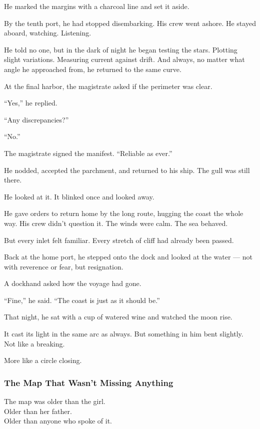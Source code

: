 \documentclass[12pt]{article}
\begin{document}
He marked the margins with a charcoal line and set it aside.

By the tenth port, he had stopped disembarking. His crew went ashore. He stayed aboard, watching. Listening.

He told no one, but in the dark of night he began testing the stars. Plotting slight variations. Measuring current against drift. And always, no matter what angle he approached from, he returned to the same curve.

At the final harbor, the magistrate asked if the perimeter was clear.

``Yes,'' he replied.

``Any discrepancies?''

``No.''

The magistrate signed the manifest. ``Reliable as ever.''

He nodded, accepted the parchment, and returned to his ship. The gull was still there.

He looked at it. It blinked once and looked away.

He gave orders to return home by the long route, hugging the coast the whole way. His crew didn’t question it. The winds were calm. The sea behaved.

But every inlet felt familiar. Every stretch of cliff had already been passed.

Back at the home port, he stepped onto the dock and looked at the water — not with reverence or fear, but resignation.

A dockhand asked how the voyage had gone.

``Fine,'' he said. ``The coast is just as it should be.''

That night, he sat with a cup of watered wine and watched the moon rise.

It cast its light in the same arc as always. But something in him bent slightly. Not like a breaking.

More like a circle closing.

\dotfill

\subsubsection*{The Map That Wasn’t Missing Anything}

The map was older than the girl.\\
Older than her father.\\
Older than anyone who spoke of it.
\end{document}
